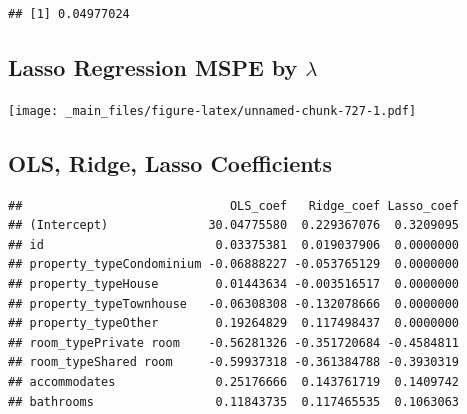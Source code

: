\documentclass[]{book}
\newenvironment{Shaded}{\begin{snugshade}}{\end{snugshade}}
\newcommand{\KeywordTok}[1]{\textcolor[rgb]{0.13,0.29,0.53}{\textbf{#1}}}
\newcommand{\DataTypeTok}[1]{\textcolor[rgb]{0.13,0.29,0.53}{#1}}
\newcommand{\DecValTok}[1]{\textcolor[rgb]{0.00,0.00,0.81}{#1}}
\newcommand{\StringTok}[1]{\textcolor[rgb]{0.31,0.60,0.02}{#1}}
\newcommand{\OperatorTok}[1]{\textcolor[rgb]{0.81,0.36,0.00}{\textbf{#1}}}
\newcommand{\NormalTok}[1]{#1}
\begin{document}
\begin{Shaded}
\end{Shaded}

\begin{verbatim}
## [1] 0.04977024
\end{verbatim}

\subsection{\texorpdfstring{Lasso Regression MSPE by
\(\lambda\)}{Lasso Regression MSPE by \textbackslash{}lambda}}\label{lasso-regression-mspe-by-lambda}

\texttt{[image: \_main\_files/figure-latex/unnamed-chunk-727-1.pdf]}

\subsection{OLS, Ridge, Lasso
Coefficients}\label{ols-ridge-lasso-coefficients}

\begin{Shaded}
\end{Shaded}

\begin{verbatim}
##                             OLS_coef   Ridge_coef Lasso_coef
## (Intercept)              30.04775580  0.229367076  0.3209095
## id                        0.03375381  0.019037906  0.0000000
## property_typeCondominium -0.06888227 -0.053765129  0.0000000
## property_typeHouse        0.01443634 -0.003516517  0.0000000
## property_typeTownhouse   -0.06308308 -0.132078666  0.0000000
## property_typeOther        0.19264829  0.117498437  0.0000000
## room_typePrivate room    -0.56281326 -0.351720684 -0.4584811
## room_typeShared room     -0.59937318 -0.361384788 -0.3930319
## accommodates              0.25176666  0.143761719  0.1409742
## bathrooms                 0.11843735  0.117465535  0.1063063
\end{verbatim}
\end{document}
